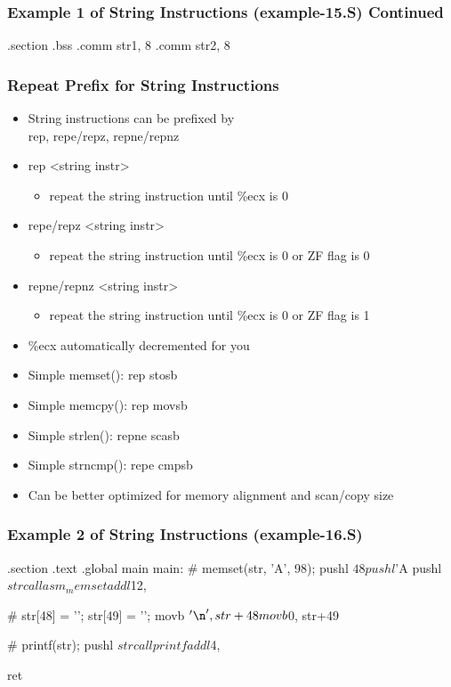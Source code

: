 \documentclass[11pt,xcolor=dvipsnames]{beamer}
\newcommand{\vs}{\vspace{0.5em}}
\newcommand{\mvs}{\vspace{-0.95em}}
\begin{document}
\begin{frame}[fragile,t]
\mvs
\frametitle{Example 1 of String Instructions (example-15.S) Continued}
\begin{gascode}
.section .bss
.comm str1, 8
.comm str2, 8
\end{gascode}
\end{frame}

\begin{frame}[fragile,t]
\frametitle{Repeat Prefix for String Instructions}
\begin{itemize}
  \item String instructions can be prefixed by \\ {\ttfamily rep, repe/repz, repne/repnz}
  \item {\ttfamily rep <string instr>}
  \begin{itemize}
    \item repeat the string instruction until {\ttfamily \%ecx} is 0
  \end{itemize}
  \item {\ttfamily repe/repz <string instr>}
  \begin{itemize}
    \item repeat the string instruction until {\ttfamily \%ecx} is 0 or ZF flag is 0
  \end{itemize}
  \item {\ttfamily repne/repnz <string instr>}
  \begin{itemize}
    \item repeat the string instruction until {\ttfamily \%ecx} is 0 or ZF flag is 1
  \end{itemize}
  \item {\ttfamily \%ecx} automatically decremented for you
  \vs
  \pause
  \item Simple {\ttfamily memset()}: {\ttfamily rep stosb}
  \item Simple {\ttfamily memcpy()}: {\ttfamily rep movsb}
  \item Simple {\ttfamily strlen()}: {\ttfamily repne scasb}
  \item Simple {\ttfamily strncmp()}: {\ttfamily repe cmpsb}
  \item Can be better optimized for memory alignment and scan/copy size
\end{itemize}
\end{frame}

\begin{frame}[fragile,t]
\mvs
\frametitle{Example 2 of String Instructions (example-16.S)}
\begin{gascode}
.section .text
.global main
main:
  # memset(str, 'A', 98);
  pushl $48
  pushl $'A 
  pushl $str
  call asm_memset
  addl $12, %

  # str[48] = '\n'; str[49] = '\0';
  movb $'\n', str+48
  movb $0, str+49

  # printf(str);
  pushl $str
  call printf
  addl $4, %

  ret
\end{gascode}
\end{frame}
\end{document}
